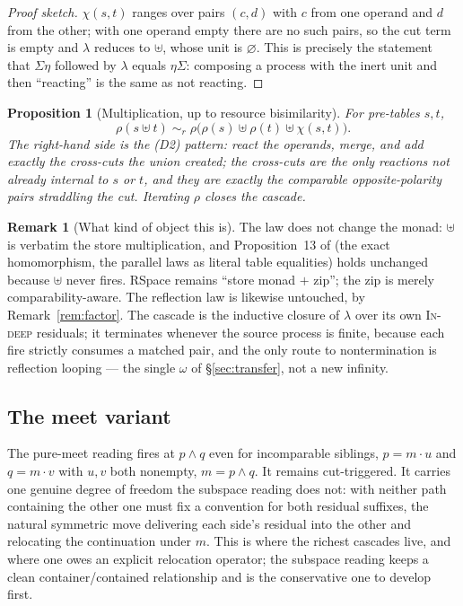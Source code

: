 \documentclass[11pt]{article}
\theoremstyle{plain}
\newtheorem{proposition}{Proposition}
\theoremstyle{definition}
\newtheorem{remark}{Remark}
\newcommand{\cut}{\chi}
\newcommand{\React}{\rho}
\newcommand{\Sig}{\Sigma}
\newcommand{\bisr}{\sim_{r}}
\begin{document}
\begin{proof}[Proof sketch]
$\cut(s,t)$ ranges over pairs $(c,d)$ with $c$ from one operand and $d$ from the other; with one
operand empty there are no such pairs, so the cut term is empty and $\lambda$ reduces to
$\uplus$, whose unit is $\varnothing$. This is precisely the statement that $\Sig\eta$ followed by
$\lambda$ equals $\eta\Sig$: composing a process with the inert unit and then ``reacting'' is the same
as not reacting.
\end{proof}

\begin{proposition}[Multiplication, up to resource bisimilarity]\label{prop:mult}
For pre-tables $s,t$,
\[
  \React(s\uplus t)\;\bisr\;\React\bigl(\React(s)\uplus\React(t)\uplus\cut(s,t)\bigr).
\]
The right-hand side is the \emph{(D2)} pattern: react the operands, merge, and add exactly the
cross-cuts the union created; the cross-cuts are the only reactions not already internal to $s$ or
$t$, and they are exactly the comparable opposite-polarity pairs straddling the cut. Iterating
$\React$ closes the cascade.
\end{proposition}

\begin{remark}[What kind of object this is]
The law does not change the monad: $\uplus$ is verbatim the store multiplication, and
Proposition~13 of \cite{KnotRho} (the exact homomorphism, the parallel laws as literal table
equalities) holds unchanged because $\uplus$ never fires. RSpace remains ``store monad $+$ zip''; the
zip is merely comparability-aware. The reflection law is likewise untouched, by
Remark~\ref{rem:factor}. The cascade is the inductive closure of $\lambda$ over its own
\textsc{In-deep} residuals; it terminates whenever the source process is finite, because each fire
strictly consumes a matched pair, and the only route to nontermination is reflection looping --- the
single $\omega$ of \S\ref{sec:transfer}, not a new infinity.
\end{remark}

\subsection{The meet variant}

The pure-meet reading fires at $p\wedge q$ even for incomparable siblings, $p=m\cdot u$ and
$q=m\cdot v$ with $u,v$ both nonempty, $m=p\wedge q$. It remains cut-triggered. It carries one genuine
degree of freedom the subspace reading does not: with neither path containing the other one must fix a
convention for both residual suffixes, the natural symmetric move delivering each side's residual into
the other and relocating the continuation under $m$. This is where the richest cascades live, and
where one owes an explicit relocation operator; the subspace reading keeps a clean
container/contained relationship and is the conservative one to develop first.
\end{document}
